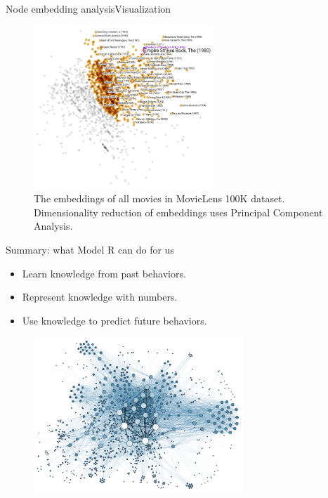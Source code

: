\documentclass{beamer}
\begin{document}
\begin{frame}{Node embedding analysis}{Visualization}
	\begin{figure}[!ht]\centering
		\includegraphics[width=0.6\textwidth]{movies-annotation}
		\caption{
			The embeddings of all movies in MovieLens 100K dataset. Dimensionality reduction of embeddings uses Principal Component Analysis.
		}
		\label{fig:movies}
	\end{figure}
\end{frame}

\begin{frame}{Summary: what Model R can do for us}
	\begin{itemize}
		\item Learn knowledge from past behaviors.
		\item Represent knowledge with numbers.
		\item Use knowledge to predict future behaviors.
	\end{itemize}
	\begin{figure}[H]\centering
		\includegraphics[width=0.7\textwidth]{Social_Network_Analysis_Visualization}
	\end{figure}
\end{frame}
\end{document}
